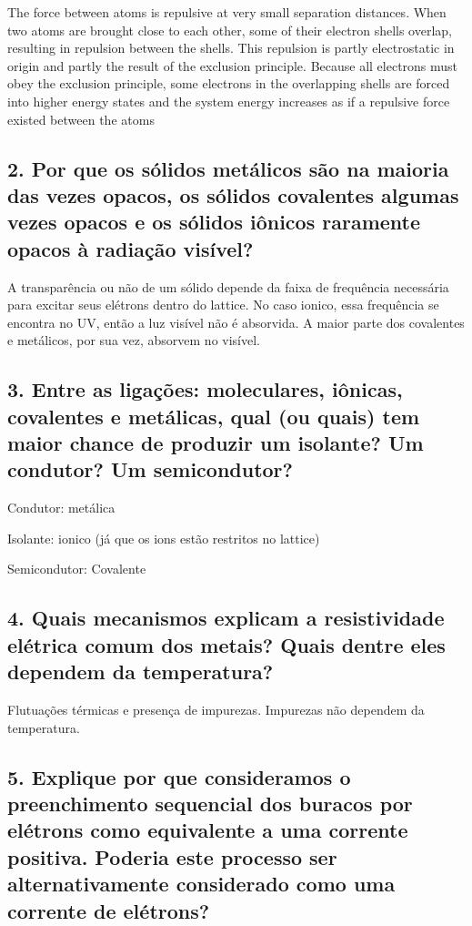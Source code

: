 \documentclass{article}
\begin{document}
The force between atoms is repulsive at very small separation distances. When two atoms are brought close to each other, some of their electron shells overlap, resulting in repulsion between the shells. This repulsion is partly electrostatic in origin and partly the result of the exclusion principle. Because all electrons must obey the exclusion principle, some electrons in the overlapping shells are forced into higher energy states and the system energy increases as if a repulsive force existed between the atoms

\subsection{2. Por que os sólidos metálicos são na maioria das vezes opacos, os sólidos covalentes  algumas vezes opacos e os sólidos iônicos raramente opacos à radiação visível? }
A transparência ou não de um sólido depende da faixa de frequência necessária para excitar seus elétrons dentro do lattice. No caso ionico, essa frequência se encontra no UV, então a luz visível não é absorvida. A maior parte dos covalentes e metálicos, por sua vez, absorvem no visível.


\subsection{3. Entre as ligações: moleculares, iônicas, covalentes e metálicas, qual (ou quais) tem  maior chance de produzir um isolante? Um condutor? Um semicondutor? }
Condutor: metálica

Isolante: ionico (já que os ions estão restritos no lattice)

Semicondutor: Covalente

\subsection{4. Quais mecanismos explicam a resistividade elétrica comum dos metais? Quais dentre  eles dependem da temperatura? }
Flutuações térmicas e presença de impurezas. Impurezas não dependem da temperatura.

\subsection{5. Explique por que consideramos o preenchimento sequencial dos buracos por elétrons como equivalente a uma corrente positiva. Poderia este processo ser alternativamente  considerado como uma corrente de elétrons? }
\end{document}
